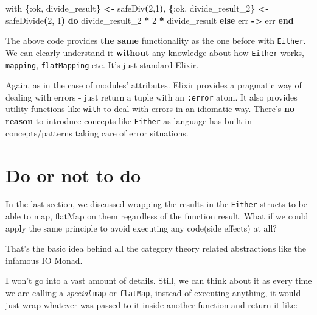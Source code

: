 \documentclass[
  oneside]{book}
\newenvironment{Shaded}{\begin{snugshade}}{\end{snugshade}}
\newcommand{\ControlFlowTok}[1]{\textcolor[rgb]{0.13,0.29,0.53}{\textbf{#1}}}
\newcommand{\DecValTok}[1]{\textcolor[rgb]{0.00,0.00,0.81}{#1}}
\newcommand{\FunctionTok}[1]{\textcolor[rgb]{0.13,0.29,0.53}{\textbf{#1}}}
\newcommand{\KeywordTok}[1]{\textcolor[rgb]{0.13,0.29,0.53}{\textbf{#1}}}
\newcommand{\NormalTok}[1]{#1}
\newcommand{\OperatorTok}[1]{\textcolor[rgb]{0.81,0.36,0.00}{\textbf{#1}}}
\newcommand{\VariableTok}[1]{\textcolor[rgb]{0.00,0.00,0.00}{#1}}
\begin{document}
\begin{Shaded}
\begin{Highlighting}[]
\NormalTok{  with }\FunctionTok{\{}\VariableTok{:ok}\NormalTok{, divide\_result}\FunctionTok{\}} \OperatorTok{\textless{}{-}}\NormalTok{ safeDiv}\FunctionTok{(}\DecValTok{2}\NormalTok{,}\DecValTok{1}\FunctionTok{)}\NormalTok{,}
       \FunctionTok{\{}\VariableTok{:ok}\NormalTok{, divide\_result\_2}\FunctionTok{\}} \OperatorTok{\textless{}{-}}\NormalTok{ safeDivide}\FunctionTok{(}\DecValTok{2}\NormalTok{, }\DecValTok{1}\FunctionTok{)}
  \KeywordTok{do}
\NormalTok{    divide\_result\_2 }\OperatorTok{*} \DecValTok{2} \OperatorTok{*}\NormalTok{ divide\_result}
  \ControlFlowTok{else}
\NormalTok{    err }\OperatorTok{{-}\textgreater{}}\NormalTok{ err}
  \KeywordTok{end}
\end{Highlighting}
\end{Shaded}

The above code provides \textbf{the same} functionality as the one before with \texttt{Either}. We can clearly understand it \textbf{without} any knowledge about how \texttt{Either} works, \texttt{mapping}, \texttt{flatMapping} etc. It's just standard Elixir.

Again, as in the case of modules' attributes. Elixir provides a pragmatic way of dealing with errors - just return a tuple with an \texttt{:error} atom. It also provides utility functions like \texttt{with} to deal with errors in an idiomatic way. There's \textbf{no reason} to introduce concepts like \texttt{Either} as language has built-in concepts/patterns taking care of error situations.

\section{Do or not to do}\label{do-or-not-to-do}

In the last section, we discussed wrapping the results in the \texttt{Either} structs to be able to map, flatMap on them regardless of the function result. What if we could apply the same principle to avoid executing any code(side effects) at all?

That's the basic idea behind all the category theory related abstractions like the infamous IO Monad.

I won't go into a vast amount of details. Still, we can think about it as every time we are calling a \emph{special} \texttt{map} or \texttt{flatMap}, instead of executing anything, it would just wrap whatever was passed to it inside another function and return it like:
\end{document}
